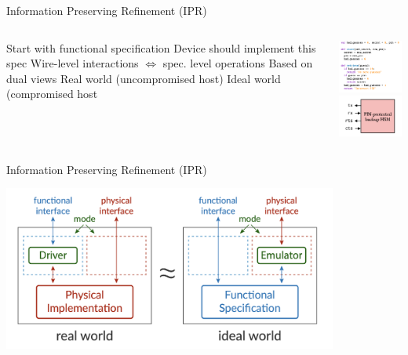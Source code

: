 \begin{frame}{Information Preserving Refinement (IPR)}
  \begin{columns}
  \begin{outline}
    \1 Start with functional specification 
    \1 Device should implement this spec
    \1 Wire-level interactions $\iff$ spec. level operations 
    \1 Based on dual views 
    \2 Real world (uncompromised host)
    \2 Ideal world (compromised host
  \end{outline}

  \centering
  \begin{center}
    \includegraphics[width=3.5cm]{func_spec.png}
    \includegraphics[width=3cm]{wire_diagram.png}
  \end{center}
\end{columns}
\end{frame}

\begin{frame}{Information Preserving Refinement (IPR)}
  \centering
  \begin{center}
    \includegraphics[width=11cm]{ipr.png}
  \end{center}

\end{frame}


